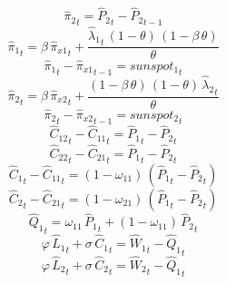 \begin{dmath}
{{\hat{\pi}_{2}}}_{t}={{\hat{P}_{2}}}_{t}-{{\hat{P}_{2}}}_{t-1}
\end{dmath}
\begin{dmath}
{{\hat{\pi}_{1}}}_{t}={{\beta}}\, {{\hat{\pi}_{x1}}}_{t}+\frac{{{\hat{\lambda}_{1}}}_{t}\, \left(1-{{\theta}}\right)\, \left(1-{{\beta}}\, {{\theta}}\right)}{{{\theta}}}
\end{dmath}
\begin{dmath}
{{\hat{\pi}_{1}}}_{t}-{{\hat{\pi}_{x1}}}_{t-1}={{sunspot_{1}}}_{t}
\end{dmath}
\begin{dmath}
{{\hat{\pi}_{2}}}_{t}={{\beta}}\, {{\hat{\pi}_{x2}}}_{t}+\frac{\left(1-{{\beta}}\, {{\theta}}\right)\, \left(1-{{\theta}}\right)\, {{\hat{\lambda}_{2}}}_{t}}{{{\theta}}}
\end{dmath}
\begin{dmath}
{{\hat{\pi}_{2}}}_{t}-{{\hat{\pi}_{x2}}}_{t-1}={{sunspot_{2}}}_{t}
\end{dmath}
\begin{dmath}
{{\hat{C}_{1 2}}}_{t}-{{\hat{C}_{1 1}}}_{t}={{\hat{P}_{1}}}_{t}-{{\hat{P}_{2}}}_{t}
\end{dmath}
\begin{dmath}
{{\hat{C}_{2 2}}}_{t}-{{\hat{C}_{2 1}}}_{t}={{\hat{P}_{1}}}_{t}-{{\hat{P}_{2}}}_{t}
\end{dmath}
\begin{dmath}
{{\hat{C}_{1}}}_{t}-{{\hat{C}_{1 1}}}_{t}=\left(1-{{\omega_{11}}}\right)\, \left({{\hat{P}_{1}}}_{t}-{{\hat{P}_{2}}}_{t}\right)
\end{dmath}
\begin{dmath}
{{\hat{C}_{2}}}_{t}-{{\hat{C}_{2 1}}}_{t}=\left(1-{{\omega_{21}}}\right)\, \left({{\hat{P}_{1}}}_{t}-{{\hat{P}_{2}}}_{t}\right)
\end{dmath}
\begin{dmath}
{{\hat{Q}_{1}}}_{t}={{\omega_{11}}}\, {{\hat{P}_{1}}}_{t}+\left(1-{{\omega_{11}}}\right)\, {{\hat{P}_{2}}}_{t}
\end{dmath}
\begin{dmath}
{{\varphi}}\, {{\hat{L}_{1}}}_{t}+{{\sigma}}\, {{\hat{C}_{1}}}_{t}={{\hat{W}_{1}}}_{t}-{{\hat{Q}_{1}}}_{t}
\end{dmath}
\begin{dmath}
{{\varphi}}\, {{\hat{L}_{2}}}_{t}+{{\sigma}}\, {{\hat{C}_{2}}}_{t}={{\hat{W}_{2}}}_{t}-{{\hat{Q}_{1}}}_{t}
\end{dmath}
